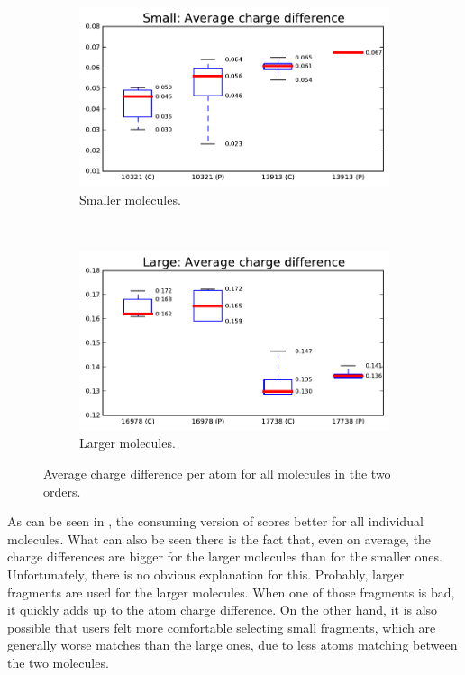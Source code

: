 \begin{figure}
\centering
\begin{subfigure}[t]{0.48\textwidth}
\centering
\includegraphics[width=\textwidth]{img/graphs/1c_01.pdf}
\caption{Smaller molecules.}
\end{subfigure}%
~
\begin{subfigure}[t]{0.48\textwidth}
\centering
\includegraphics[width=\textwidth]{img/graphs/1d_01.pdf}
\caption{Larger molecules.}
\end{subfigure}
\caption{Average charge difference per atom for all molecules in the two orders.}
\end{figure}

As can be seen in , the consuming version of \oframp{} scores better for all individual molecules. What can also be seen there is the fact that, even on average, the charge differences are bigger for the larger molecules than for the smaller ones. Unfortunately, there is no obvious explanation for this. Probably, larger fragments are used for the larger molecules. When one of those fragments is bad, it quickly adds up to the atom charge difference. On the other hand, it is also possible that users felt more comfortable selecting small fragments, which are generally worse matches than the large ones, due to less atoms matching between the two molecules.

